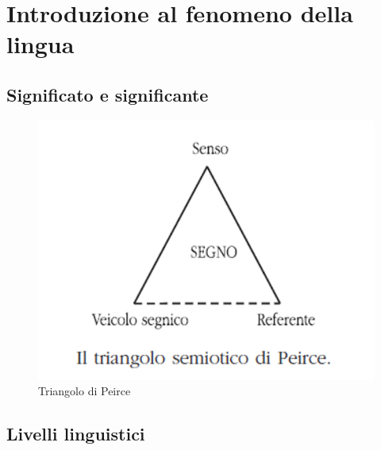 \chapter{Introduzione al fenomeno della lingua}
\section{Significato e significante}

\begin{abstract}
Il linguaggio è uno strumento per trasmettere informazioni attraverso una serie di simboli. Ma cosa è un simbolo? Dato un oggetto (significato), un simbolo è ciò che lo rappresenta (significante).
I veicoli segnici rappresentano i sensi delle parole (che sono nell'iperuranio/nella testa dei parlanti).
\end{abstract}

\begin{figure}
    \centering
    \includegraphics[width=0.5\linewidth]{peirce.PNG}
    \caption{Triangolo di Peirce}
    \label{fig:enter-label}
\end{figure}

\begin{abstract}
Tuttavi andare dal veicolo segnico al senso e viceversa non è immediato poichè la relazione è 'molti a molti', infatti, la rappresentazione naturale soffre di molti "difetti", come ad esempio la ricchezza espressiva(più veicoli segnici vanno in un unico senso), l'arbitrarietà e l'ambiguità (più sensi vanno in uno stesso veicolo segnico).
\begin{Oss}{Esempio:} Una vecchia legge la regola \end{Oss}
Esistono però vari tipi di ambiguità in base al livello linguistico in cui ci troviamo.
\end{abstract}

\section{Livelli linguistici}


